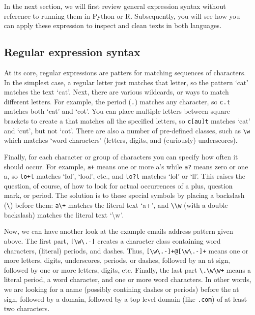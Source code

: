 In the next section, we will first review general expression syntax without reference to running them in Python or R.
Subsequently, you will see how you can apply these expression to inspect and clean texts in both languages.

\subsection{Regular expression syntax}

At its core, regular expressions are patters for matching sequences of characters.
In the simplest case, a regular letter just matches that letter, so the pattern `cat' matches the text `cat'.
Next, there are various wildcards, or ways to match different letters.
For example, the period (\verb|.|) matches any character, so \verb|c.t| matches both `cat' and `cot'.
You can place multiple letters between square brackets to create a  that matches all the specified letters, so \verb|c[au]t| matches `cat' and `cut', but not `cot'.
There are also a number of pre-defined classes, such as \verb|\w| which matches `word characters' (letters, digits, and (curiously) underscores).

Finally, for each character or group of characters you can specify how often it should occur.
For example, \verb|a+| means one or more a's while \verb|a?| means zero or one a, so \verb|lo+l| matches `lol', `lool', etc.,
and \verb|lo?l| matches `lol' or `ll'.
This raises the question, of course, of how to look for actual occurrences of a plus, question mark, or period.
The solution is to  these special symbols by placing a backslash (\verb|\|) before them:
\verb|a\+| matches the literal text `a+', and \verb|\\w| (with a double backslash) matches the literal text `\textbackslash w'. 

Now, we can have another look at the example emails address pattern given above.
The first part, \verb|[\w\.-]| creates a character class containing word characters, (literal) periods, and dashes.
Thus, \verb|[\w\.-]+@[\w\.-]+| means one or more letters, digits, underscores, periods, or dashes, followed by an at sign,
followed by one or more letters, digits, etc.
Finally, the last part \verb|\.\w\w+| means a literal period, a word character, and one or more word characters.
In other words, we are looking for a name (possibly contining dashes or periods) before the at sign,
followed by a domain, followed by a top level domain (like \verb|.com|) of at least two characters.

